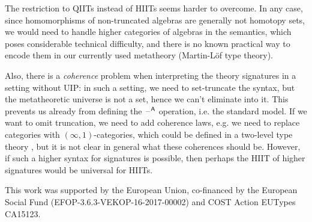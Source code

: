 \documentclass[acmsmall,screen]{acmart}
\begin{document}
The restriction to QIITs instead of HIITs seems harder to overcome. In
any case, since homomorphisms of non-truncated algebras are generally
not homotopy sets, we would need to handle higher categories of
algebras in the semantics, which poses considerable technical
difficulty, and there is no known practical way to encode them in our
currently used metatheory (Martin-Löf type theory).

Also, there is a \emph{coherence} problem when interpreting the theory
signatures in a setting without UIP: in such a setting, we need to
set-truncate the syntax, but the metatheoretic universe is not a set,
hence we can't eliminate into it. This prevents us already from
defining the $\mathord{\hspace{1pt}\text{--}\hspace{1pt}}^{\mathsf{A}}$ operation, i.e. the standard model. If we
want to omit truncation, we need to add coherence laws, e.g. we need
to replace categories with $(\infty,1)$-categories, which could be
defined in a two-level type theory \cite{semisegal}, but it is not
clear in general what these coherences should be. However, if such a
higher syntax for signatures is possible, then perhaps the HIIT of
higher signatures would be universal for HIITs.




\begin{acks}                            %
This work was supported by the European Union, co-financed by the
European Social Fund (EFOP-3.6.3-VEKOP-16-2017-00002) and COST Action
EUTypes CA15123.
\end{acks}



\end{document}
